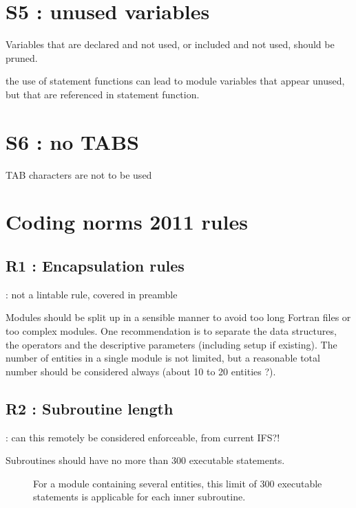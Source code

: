 \documentclass[letterpaper,10pt,english]{sphinxmanual}
\begin{document}
\section{S5 : unused variables}
\label{\detokenize{rules/S5:s5-unused-variables}}\label{\detokenize{rules/S5::doc}}
Variables that are declared and not used, or included and not used, should be pruned.

the use of statement functions can lead to module variables that appear unused, but that are
referenced in statement function.


\section{S6 : no TABS}
\label{\detokenize{rules/S6:s6-no-tabs}}\label{\detokenize{rules/S6::doc}}
TAB characters are not to be used


\section{Coding norms 2011 rules}
\label{\detokenize{obsolescent/index:coding-norms-2011-rules}}\label{\detokenize{obsolescent/index::doc}}

\subsection{R1 : Encapsulation rules}
\label{\detokenize{obsolescent/r1:r1-encapsulation-rules}}\label{\detokenize{obsolescent/r1::doc}}
: not a lintable rule, covered in preamble

Modules should be split up in a sensible manner to avoid too long Fortran files or too complex modules.
One recommendation is to separate the data structures, the operators and the descriptive parameters
(including setup if existing).
The number of entities in a single module is not limited, but a reasonable total number should be
considered always (about 10 to 20 entities ?).


\subsection{R2 : Subroutine length}
\label{\detokenize{obsolescent/r2:r2-subroutine-length}}\label{\detokenize{obsolescent/r2::doc}}
 : can this remotely be considered enforceable, from current IFS?!
\begin{description}
\item[{Subroutines should have no more than 300 executable statements.}] \leavevmode
For a module containing several entities, this limit of 300 executable statements is applicable for each inner subroutine.

\end{description}
\end{document}
